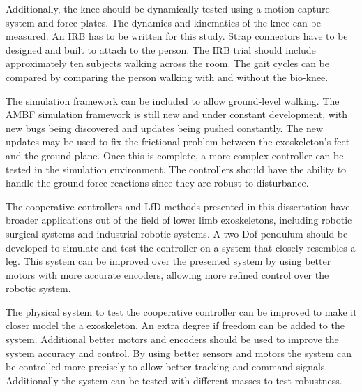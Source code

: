 
Additionally, the knee should be dynamically tested using a motion capture system and force plates. The dynamics and kinematics of the knee can be measured. An IRB has to be written for this study. Strap connectors have to be designed and built to attach to the person. The IRB trial should include approximately ten subjects walking across the room. The gait cycles can be compared by comparing the person walking with and without the bio-knee. 

The simulation framework can be included to allow ground-level walking. The AMBF simulation framework is still new and under constant development, with new bugs being discovered and updates being pushed constantly. The new updates may be used to fix the frictional problem between the exoskeleton's feet and the ground plane. Once this is complete, a more complex controller can be tested in the simulation environment. The controllers should have the ability to handle the ground force reactions since they are robust to disturbance. 

The cooperative controllers and LfD methods presented in this dissertation have broader applications out of the field of lower limb exoskeletons, including robotic surgical systems and industrial robotic systems. A two Dof pendulum should be developed to simulate and test the controller on a system that closely resembles a leg. This system can be improved over the presented system by using better motors with more accurate encoders, allowing more refined control over the robotic system. 

The physical system to test the cooperative controller can be improved to make it closer model the a exoskeleton. An extra degree if freedom can be added to the system. Additional better motors and encoders should be used to improve the system accuracy and control. By using better sensors and motors the system can be controlled more precisely to allow better tracking and command signals. Additionally the system can be tested with different masses to test robustness.   

